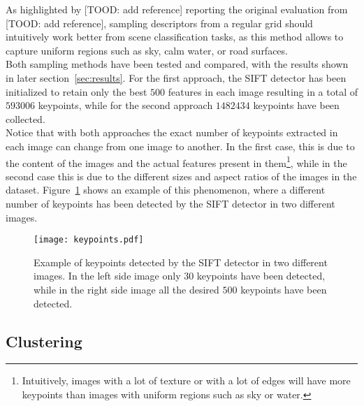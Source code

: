 \documentclass[../main.tex]{subfiles}
\begin{document}
As highlighted by  [TOOD: add reference] reporting the original evaluation from  [TOOD: add reference], sampling descriptors from a regular grid should intuitively work better from scene classification tasks, as this method allows to capture uniform regions such as sky, calm water, or road surfaces.\\
Both sampling methods have been tested and compared, with the results shown in later section~\ref{sec:results}. For the first approach, the SIFT detector has been initialized to retain only the best $500$ features in each image resulting in a total of $\num{593006}$ keypoints, while for the second approach $\num{1482434}$ keypoints have been collected.\\
Notice that with both approaches the exact number of keypoints extracted in each image can change from one image to another. In the first case, this is due to the content of the images and the actual features present in them\footnote{Intuitively, images with a lot of texture or with a lot of edges will have more keypoints than images with uniform regions such as sky or water.}, while in the second case this is due to the different sizes and aspect ratios of the images in the dataset. Figure~\ref{fig:keypoints-example} shows an example of this phenomenon, where a different number of keypoints has been detected by the SIFT detector in two different images.

\begin{figure}[H]
  \centering
  \texttt{[image: keypoints.pdf]}
  \caption{Example of keypoints detected by the SIFT detector in two different images. In the left side image only $30$ keypoints have been detected, while in the right side image all the desired $500$ keypoints have been detected.}
  \label{fig:keypoints-example}
\end{figure}


\subsection{Clustering}\label{subsec:clustering}
\end{document}
